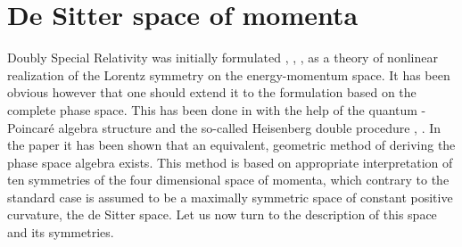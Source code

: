 \documentclass  [12pt] {article}
\begin{document}
\section{De Sitter space of momenta}

Doubly Special Relativity was initially formulated
\cite{Amelino-Camelia:2000ge}, \cite{Amelino-Camelia:2000mn}, \cite{jkgminl},
\cite{rbgacjkg} as a theory of nonlinear realization of the Lorentz symmetry on
the energy-momentum space. It has been obvious however that one should extend
it to the formulation based on the complete phase space. This has been done in
\cite{Kowalski-Glikman:2002jr} with the help of the quantum \myHighlight{$\kappa$}\coordHE{}-Poincar\'e
algebra structure and the so-called Heisenberg double procedure
\cite{crossalg}, \cite{luno}. In the paper \cite{Kowalski-Glikman:2002ft} it
has been shown that an equivalent, geometric method of deriving the phase space
algebra exists. This method is based on appropriate interpretation of ten
symmetries of the four dimensional space of momenta, which contrary to the
standard case is assumed to be a maximally symmetric space of constant positive
curvature, the de Sitter space. Let us now turn to the description of this
space and its symmetries.
\end{document}
